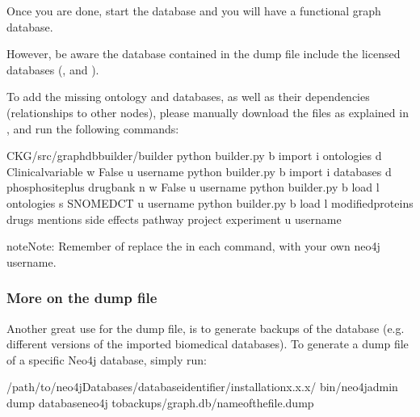 \documentclass[letterpaper,10pt,english]{sphinxmanual}
\begin{document}
Once you are done, start the database and you will have a functional graph database.

However, be aware the database contained in the dump file  include the licensed databases (,  and ).

To add the missing ontology and databases, as well as their dependencies (relationships to other nodes), please manually download the files as explained in {\hyperref[\detokenize{intro/getting-started-with-build:build-neo4j-graph-database}]{}}, and run the following commands:

\begin{sphinxVerbatim}[commandchars=\\\{\}]
\PYGZdl{}  CKG/src/graphdb\PYGZus{}builder/builder
\PYGZdl{} python builder.py \PYGZhy{}b import \PYGZhy{}i ontologies \PYGZhy{}d Clinical\PYGZus{}variable \PYGZhy{}w False \PYGZhy{}u username
\PYGZdl{} python builder.py \PYGZhy{}b import \PYGZhy{}i databases \PYGZhy{}d phosphositeplus drugbank \PYGZhy{}n  \PYGZhy{}w False \PYGZhy{}u username
\PYGZdl{} python builder.py \PYGZhy{}b load \PYGZhy{}l ontologies \PYGZhy{}s SNOMED\PYGZus{}CT \PYGZhy{}u username
\PYGZdl{} python builder.py \PYGZhy{}b load \PYGZhy{}l modified\PYGZus{}proteins drugs mentions side effects pathway project experiment \PYGZhy{}u username
\end{sphinxVerbatim}

\begin{sphinxadmonition}{note}{Note:}
Remember of replace the  in each command, with your own neo4j username.
\end{sphinxadmonition}


\subsubsection{More on the dump file}
\label{\detokenize{intro/getting-started-with-build:more-on-the-dump-file}}
Another great use for the dump file, is to generate backups of the database (e.g. different versions of the imported biomedical databases).
To generate a dump file of a specific Neo4j database, simply run:

\begin{sphinxVerbatim}[commandchars=\\\{\}]
\PYGZdl{}  /path/to/neo4jDatabases/database\PYGZhy{}identifier/installation\PYGZhy{}x.x.x/
\PYGZdl{} bin/neo4j\PYGZhy{}admin dump \PYGZhy{}\PYGZhy{}databaseneo4j \PYGZhy{}\PYGZhy{}tobackups/graph.db/name\PYGZus{}of\PYGZus{}the\PYGZus{}file.dump
\end{sphinxVerbatim}
\end{document}
